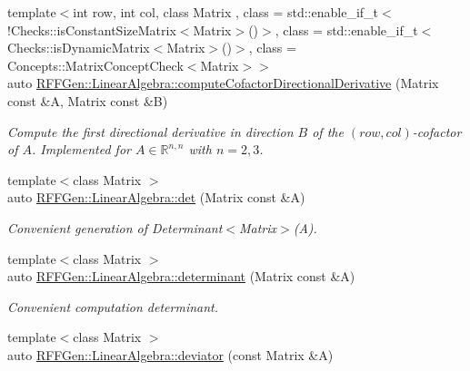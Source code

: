 \begin{DoxyCompactItemize}
{\footnotesize template$<$int row, int col, class Matrix , class  = std\-::enable\-\_\-if\-\_\-t$<$!\-Checks\-::is\-Constant\-Size\-Matrix$<$\-Matrix$>$()$>$, class  = std\-::enable\-\_\-if\-\_\-t$<$\-Checks\-::is\-Dynamic\-Matrix$<$\-Matrix$>$()$>$, class  = Concepts\-::\-Matrix\-Concept\-Check$<$\-Matrix$>$$>$ }\\auto \hyperlink{group__LinearAlgebraGroup_gae69e50e6a283915070eda9758e96aaaf}{R\-F\-F\-Gen\-::\-Linear\-Algebra\-::compute\-Cofactor\-Directional\-Derivative} (Matrix const \&A, Matrix const \&B)
\begin{DoxyCompactList}\small\item\em Compute the first directional derivative in direction $ B $ of the $(row,col)$-\/cofactor of $ A $. Implemented for $ A\in \mathbb{R}^{n,n} $ with $ n=2,3 $. \end{DoxyCompactList}\item 
\hypertarget{group__LinearAlgebraGroup_gaf7734d2f5a3026db85ddaca74322db6a}{{\footnotesize template$<$class Matrix $>$ }\\auto \hyperlink{group__LinearAlgebraGroup_gaf7734d2f5a3026db85ddaca74322db6a}{R\-F\-F\-Gen\-::\-Linear\-Algebra\-::det} (Matrix const \&A)}\label{group__LinearAlgebraGroup_gaf7734d2f5a3026db85ddaca74322db6a}

\begin{DoxyCompactList}\small\item\em Convenient generation of Determinant$<$\-Matrix$>$(\-A). \end{DoxyCompactList}\item 
\hypertarget{group__LinearAlgebraGroup_ga6cbd9a0f6299e29fae3d47c2c229c816}{{\footnotesize template$<$class Matrix $>$ }\\auto \hyperlink{group__LinearAlgebraGroup_ga6cbd9a0f6299e29fae3d47c2c229c816}{R\-F\-F\-Gen\-::\-Linear\-Algebra\-::determinant} (Matrix const \&A)}\label{group__LinearAlgebraGroup_ga6cbd9a0f6299e29fae3d47c2c229c816}

\begin{DoxyCompactList}\small\item\em Convenient computation determinant. \end{DoxyCompactList}\item 
\hypertarget{group__LinearAlgebraGroup_ga374042eeb502ef4d59d18f11a8b55a80}{{\footnotesize template$<$class Matrix $>$ }\\auto \hyperlink{group__LinearAlgebraGroup_ga374042eeb502ef4d59d18f11a8b55a80}{R\-F\-F\-Gen\-::\-Linear\-Algebra\-::deviator} (const Matrix \&A)}\label{group__LinearAlgebraGroup_ga374042eeb502ef4d59d18f11a8b55a80}


\end{DoxyCompactItemize}
